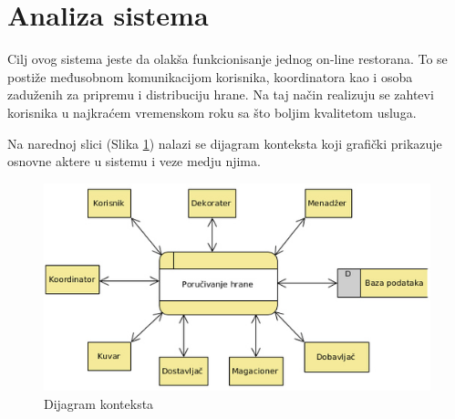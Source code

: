 
\section{Analiza sistema}
Cilj ovog sistema jeste da olakša funkcionisanje jednog on-line restorana. To se postiže međusobnom komunikacijom korisnika, koordinatora kao i osoba zaduženih za pripremu i distribuciju hrane. Na taj način realizuju se zahtevi korisnika u najkraćem vremenskom roku sa što boljim kvalitetom usluga.

Na narednoj slici (Slika \ref{fig:slika1}) nalazi se dijagram konteksta koji grafički prikazuje osnovne aktere u sistemu i veze medju njima.



\begin{figure}[ht]
    \leavevmode
    \begin{center}
    \includegraphics[height=0.3\textheight]{slike/DC.jpg}
    \end{center}
    \caption{Dijagram konteksta} %
    \label{fig:slika1}
\end{figure}






